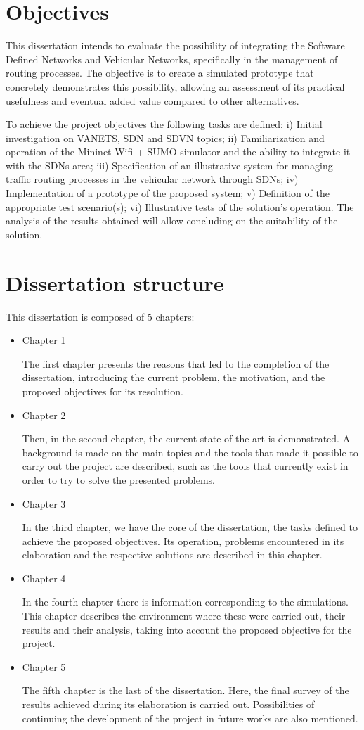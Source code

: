 \documentclass[
  oneside,
  11pt, a4paper,
  footinclude=true,
  headinclude=true,
  cleardoublepage=empty
]{scrbook}
\begin{document}
\section{Objectives}
\label{objectives}
\par{This dissertation intends to evaluate the possibility of integrating the Software Defined Networks and Vehicular Networks, specifically in the management of routing processes. The objective is to create a simulated prototype that concretely demonstrates this possibility, allowing an assessment of its practical usefulness and eventual added value compared to other alternatives.}

To achieve the project objectives the following tasks are defined:
i) Initial investigation on VANETS, SDN and SDVN topics;
ii) Familiarization and operation of the Mininet-Wifi + SUMO simulator and the ability to integrate it with the SDNs area;
iii) Specification of an illustrative system for managing traffic routing processes in the vehicular network through SDNs;
iv) Implementation of a prototype of the proposed system;
v) Definition of the appropriate test scenario(s);
vi) Illustrative tests of the solution's operation.
The analysis of the results obtained will allow concluding on the suitability of the solution.

\section{Dissertation structure}
This dissertation is composed of 5 chapters:
\begin{itemize}
\item Chapter 1
\par {The first chapter presents the reasons that led to the completion of the dissertation, introducing the current problem, the motivation, and the proposed objectives for its resolution.}
\item Chapter 2
\par{Then, in the second chapter, the current state of the art is demonstrated. A background is made on the main topics and the tools that made it possible to carry out the project are described, such as the tools that currently exist in order to try to solve the presented problems.}
\item Chapter 3
\par{In the third chapter, we have the core of the dissertation, the tasks defined to achieve the proposed objectives. Its operation, problems encountered in its elaboration and the respective solutions are described in this chapter.}
\item Chapter 4
\par{In the fourth chapter there is information corresponding to the simulations. This chapter describes the environment where these were carried out, their results and their analysis, taking into account the proposed objective for the project.}
\item Chapter 5
\par{The fifth chapter is the last of the dissertation. Here, the final survey of the results achieved during its elaboration is carried out. Possibilities of continuing the development of the project in future works are also mentioned.}
\end{itemize}
\end{document}
